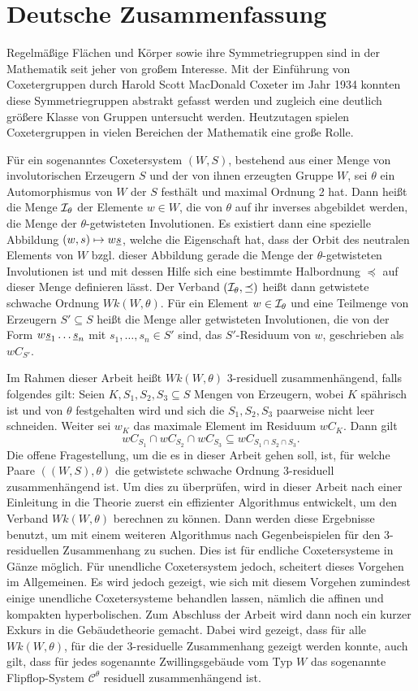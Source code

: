 \chapter*{Deutsche Zusammenfassung}

Regelmäßige Flächen und Körper sowie ihre Symmetriegruppen sind in der Mathematik seit jeher von großem Interesse. Mit der Einführung von Coxetergruppen durch Harold Scott MacDonald Coxeter im Jahr 1934 konnten diese Symmetriegruppen abstrakt gefasst werden und zugleich eine deutlich größere Klasse von Gruppen untersucht werden. Heutzutagen spielen Coxetergruppen in vielen Bereichen der Mathematik eine große Rolle.

Für ein sogenanntes Coxetersystem $(W,S)$, bestehend aus einer Menge von involutorischen Erzeugern $S$ und der von ihnen erzeugten Gruppe $W$, sei $\theta$ ein Automorphismus von $W$ der $S$ festhält und maximal Ordnung 2 hat. Dann heißt die Menge $\mathcal{I}_{\theta}$ der Elemente $w \in W$, die von $\theta$ auf ihr inverses abgebildet werden, die Menge der $\theta$-getwisteten Involutionen. Es existiert dann eine spezielle Abbildung $(w,s) \mapsto w \underline{s}$, welche die Eigenschaft hat, dass der Orbit des neutralen Elements von $W$ bzgl. dieser Abbildung gerade die Menge der $\theta$-getwisteten Involutionen ist und mit dessen Hilfe sich eine bestimmte Halbordnung $\preceq$ auf dieser Menge definieren lässt. Der Verband $(\mathcal{I}_{\theta},\preceq)$ heißt dann getwistete schwache Ordnung $Wk(W,\theta)$. Für ein Element $w \in \mathcal{I}_{\theta}$ und eine Teilmenge von Erzeugern $S' \subseteq S$ heißt die Menge aller getwisteten Involutionen, die von der Form $w \underline{s}_1 \ldots \underline{s}_n$ mit $s_1,\ldots,s_n \in S'$ sind, das $S'$-Residuum von $w$, geschrieben als $w C_{S'}$.

Im Rahmen dieser Arbeit heißt $Wk(W,\theta)$ 3-residuell zusammenhängend, falls folgendes gilt: Seien $K,S_1,S_2,S_3 \subseteq S$ Mengen von Erzeugern, wobei $K$ spährisch ist und von $\theta$ festgehalten wird und sich die $S_1,S_2,S_3$ paarweise nicht leer schneiden. Weiter sei $w_K$ das maximale Element im Residuum $w C_K$. Dann gilt
$$ w C_{S_1} \cap w C_{S_2} \cap w C_{S_3} \subseteq w C_{S_1 \cap S_2 \cap S_3}. $$
Die offene Fragestellung, um die es in dieser Arbeit gehen soll, ist, für welche Paare $((W,S),\theta)$ die getwistete schwache Ordnung 3-residuell zusammenhängend ist. Um dies zu überprüfen, wird in dieser Arbeit nach einer Einleitung in die Theorie zuerst ein effizienter Algorithmus entwickelt, um den Verband $Wk(W,\theta)$ berechnen zu können. Dann werden diese Ergebnisse benutzt, um mit einem weiteren Algorithmus nach Gegenbeispielen für den 3-residuellen Zusammenhang zu suchen. Dies ist für endliche Coxetersysteme in Gänze möglich. Für unendliche Coxetersystem jedoch, scheitert dieses Vorgehen im Allgemeinen. Es wird jedoch gezeigt, wie sich mit diesem Vorgehen zumindest einige unendliche Coxetersysteme behandlen lassen, nämlich die affinen und kompakten hyperbolischen. Zum Abschluss der Arbeit wird dann noch ein kurzer Exkurs in die Gebäudetheorie gemacht. Dabei wird gezeigt, dass für alle $Wk(W,\theta)$, für die der 3-residuelle Zusammenhang gezeigt werden konnte, auch gilt, dass für jedes sogenannte Zwillingsgebäude vom Typ $W$ das sogenannte Flipflop-System $\mathcal{C}^\theta$ residuell zusammenhängend ist.